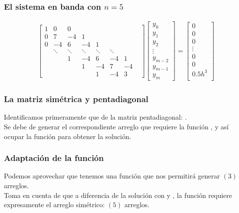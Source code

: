 \documentclass[12pt]{beamer}
\begin{document}
\begin{frame}
\frametitle{El sistema en banda con $n = 5$}
\renewcommand{\arraystretch}{0.9}
\begin{align*}
\begin{bmatrix}
1 & 0 & 0 & & & & & \\
0 & 7 & -4 & 1 & & & & \\
0 & -4 & 6 & -4 & 1 & & & \\
 & \ddots & \ddots & \ddots & \ddots & \ddots & & \\
 & & 1 & -4 & 6 & -4 & 1 \\
 & & & 1 & -4 & 7 & -4 \\
 & & & & 1 & -4 & 3
\end{bmatrix}
\begin{bmatrix}
y_{0} \\
y_{1} \\
y_{2} \\
\vdots \\
y_{m-2} \\
y_{m-1} \\
y_{m}
\end{bmatrix}
=
\begin{bmatrix}
0 \\
0 \\
0 \\
\vdots \\
0 \\
0 \\
0.5 h^{3} \\
\end{bmatrix}
\end{align*}
\end{frame}
\begin{frame}
\frametitle{La matriz simétrica y pentadiagonal}
Identificamos primeramente que de la matriz pentadiagonal: .
\\
\bigskip
\pause
Se debe de generar el correspondiente arreglo  que requiere la función , y así ocupar la función para obtener la solución.
\end{frame}
\begin{frame}
\frametitle{Adaptación de la función}
Podemos aprovechar que tenemos una función  que nos permitirá generar $(3)$ arreglos.
\\
\bigskip
\pause
Toma en cuenta de que a diferencia de la solución con  y , la función  requiere expresamente el arreglo simétrico: $(5)$ arreglos.
\end{frame}
\end{document}
